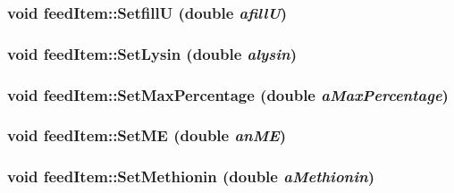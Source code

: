 \label{classfeed_item_a8ccb6b7516b1700a77e743ea15d778be}
\hypertarget{classfeed_item_af6ad7e93e9036dfb34a73c3232546d72}{
\subsubsection[{SetfillU}]{\setlength{\rightskip}{0pt plus 5cm}void feedItem::SetfillU (double {\em afillU})}}
\label{classfeed_item_af6ad7e93e9036dfb34a73c3232546d72}
\hypertarget{classfeed_item_a8dd468e3cf1562e32c18f31363d4c3ea}{
\subsubsection[{SetLysin}]{\setlength{\rightskip}{0pt plus 5cm}void feedItem::SetLysin (double {\em alysin})}}
\label{classfeed_item_a8dd468e3cf1562e32c18f31363d4c3ea}
\hypertarget{classfeed_item_aef50d0ad2fdb85bd962dfe5ee4fc5c4b}{
\subsubsection[{SetMaxPercentage}]{\setlength{\rightskip}{0pt plus 5cm}void feedItem::SetMaxPercentage (double {\em aMaxPercentage})}}
\label{classfeed_item_aef50d0ad2fdb85bd962dfe5ee4fc5c4b}
\hypertarget{classfeed_item_a524a9bf0c873bd9a420c3d66f837d005}{
\subsubsection[{SetME}]{\setlength{\rightskip}{0pt plus 5cm}void feedItem::SetME (double {\em anME})}}
\label{classfeed_item_a524a9bf0c873bd9a420c3d66f837d005}
\hypertarget{classfeed_item_a460189522e05438ac2c087df40434cd5}{
\subsubsection[{SetMethionin}]{\setlength{\rightskip}{0pt plus 5cm}void feedItem::SetMethionin (double {\em aMethionin})}}
